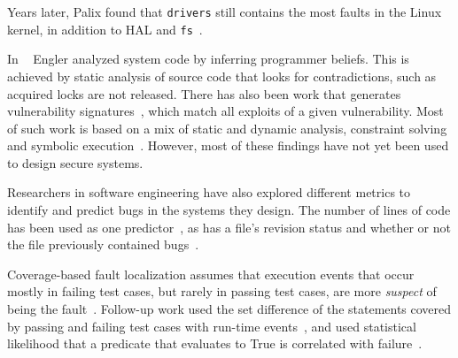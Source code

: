 Years later, Palix found that \texttt{drivers} still contains the most faults in
the Linux kernel, in addition to HAL and \texttt{fs}~\cite{palix2011faults}.


In ~\cite{engler2001bugs} Engler analyzed system code by inferring programmer
beliefs.  This is achieved by static analysis
of source code that looks for contradictions, such as acquired locks are
not released. There has also been work that generates vulnerability
signatures~\cite{brumley2006towards}, which match all exploits
of a given vulnerability. Most of such work is based on a mix of static and
dynamic analysis, constraint solving and symbolic execution~\cite{chou2003static}.
However, most of these findings have not yet been used to design
secure systems.

Researchers in software engineering have also explored different metrics to identify and predict bugs in the systems they design. The number of lines of code has been used as one predictor~\cite{Bug-Location}, as has a file's revision status and
whether or not the file previously contained bugs~\cite{Bug-Location, lewis2013does}. 


Coverage-based fault localization assumes that execution events that occur mostly in failing
test cases, but rarely in passing test cases, are more \textit{suspect}
of being the fault~\cite{jones2002visualization}. Follow-up work used
the set difference of the statements covered by passing and failing test
cases with run-time events~\cite{agrawal1995fault, jones2005empirical},
and used statistical likelihood that a predicate that evaluates to True is correlated with failure~\cite{liblit2005scalable}.




